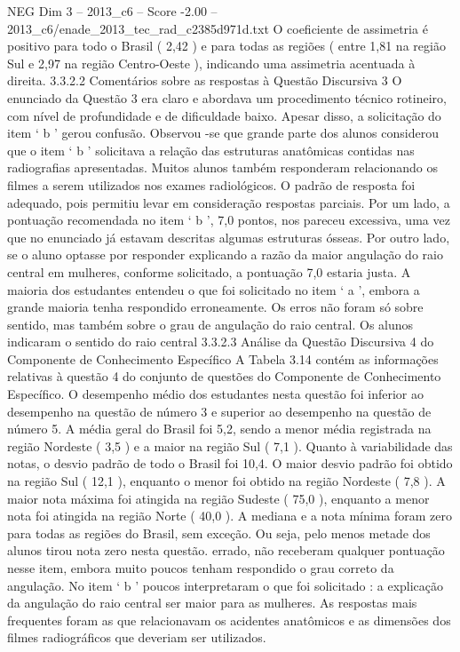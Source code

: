 \begin{textsample}{NEG Dim 3 – 2013\_c6 – Score -2.00 – 2013\_c6/enade\_2013\_tec\_rad\_c2385d971d.txt}
O coeficiente de assimetria é positivo para todo o Brasil ( 2,42 ) e para todas as regiões ( entre 1,81 na região Sul e 2,97 na região Centro-Oeste ), indicando uma assimetria acentuada à direita. 3.3.2.2 Comentários sobre as respostas à Questão Discursiva 3 O enunciado da Questão 3 era claro e abordava um procedimento técnico rotineiro, com nível de profundidade e de dificuldade baixo.
Apesar disso, a solicitação do item ‘ b ’ gerou confusão.
Observou -se que grande parte dos alunos considerou que o item ‘ b ’ solicitava a relação das estruturas anatômicas contidas nas radiografias apresentadas.
Muitos alunos também responderam relacionando os filmes a serem utilizados nos exames radiológicos.
O padrão de resposta foi adequado, pois permitiu levar em consideração respostas parciais.
Por um lado, a pontuação recomendada no item ‘ b ’, 7,0 pontos, nos pareceu excessiva, uma vez que no enunciado já estavam descritas algumas estruturas ósseas.
Por outro lado, se o aluno optasse por responder explicando a razão da maior angulação do raio central em mulheres, conforme solicitado, a pontuação 7,0 estaria justa.
A maioria dos estudantes entendeu o que foi solicitado no item ‘ a ’, embora a grande maioria tenha respondido erroneamente.
Os erros não foram só sobre sentido, mas também sobre o grau de angulação do raio central.
Os alunos indicaram o sentido do raio central 3.3.2.3 Análise da Questão Discursiva 4 do Componente de Conhecimento Específico A Tabela 3.14 contém as informações relativas à questão 4 do conjunto de questões do Componente de Conhecimento Específico.
O desempenho médio dos estudantes nesta questão foi inferior ao desempenho na questão de número 3 e superior ao desempenho na questão de número 5.
A média geral do Brasil foi 5,2, sendo a menor média registrada na região Nordeste ( 3,5 ) e a maior na região Sul ( 7,1 ).
Quanto à variabilidade das notas, o desvio padrão de todo o Brasil foi 10,4.
O maior desvio padrão foi obtido na região Sul ( 12,1 ), enquanto o menor foi obtido na região Nordeste ( 7,8 ).
A maior nota máxima foi atingida na região Sudeste ( 75,0 ), enquanto a menor nota foi atingida na região Norte ( 40,0 ).
A mediana e a nota mínima foram zero para todas as regiões do Brasil, sem exceção.
Ou seja, pelo menos metade dos alunos tirou nota zero nesta questão. errado, não receberam qualquer pontuação nesse item, embora muito poucos tenham respondido o grau correto da angulação.
No item ‘ b ’ poucos interpretaram o que foi solicitado : a explicação da angulação do raio central ser maior para as mulheres.
As respostas mais frequentes foram as que relacionavam os acidentes anatômicos e as dimensões dos filmes radiográficos que deveriam ser utilizados.

\end{textsample}
